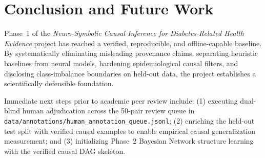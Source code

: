\documentclass[11pt,a4paper]{article}
\begin{document}
\section{Conclusion and Future Work}
\label{sec:conclusion}

Phase~1 of the \textit{Neuro-Symbolic Causal Inference for Diabetes-Related Health Evidence} project has reached a verified, reproducible, and offline-capable baseline. By systematically eliminating misleading provenance claims, separating heuristic baselines from neural models, hardening epidemiological causal filters, and disclosing class-imbalance boundaries on held-out data, the project establishes a scientifically defensible foundation. 

Immediate next steps prior to academic peer review include: (1) executing dual-blind human adjudication across the 50-pair review queue in \texttt{data/annotations/human\_annotation\_queue.jsonl}; (2) enriching the held-out test split with verified causal examples to enable empirical causal generalization measurement; and (3) initializing Phase~2 Bayesian Network structure learning with the verified causal DAG skeleton.



\end{document}
